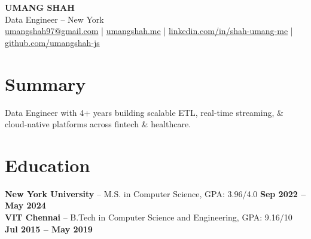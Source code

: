 \documentclass[letterpaper]{article}
\begin{document}
\begin{center}
{\Large \textbf{UMANG SHAH}}\\[-1pt]
Data Engineer -- New York\\[-1pt]
\href{mailto:umangshah97@gmail.com}{umangshah97@gmail.com} \;|\; \href{https://umangshah.me}{umangshah.me} \;|\; \href{https://www.linkedin.com/in/shah-umang-me}{linkedin.com/in/shah-umang-me} \;|\; \href{https://github.com/umangshah-js}{github.com/umangshah-js}
\end{center}

\vspace{-8pt}

\section*{Summary}
Data Engineer with 4+ years building scalable ETL, real-time streaming, \& cloud-native platforms across fintech \& healthcare.

\vspace{0pt}

\section*{Education}
\textbf{New York University} -- M.S. in Computer Science, GPA: 3.96/4.0 \hfill \textbf{Sep 2022 -- May 2024} \\
\textbf{VIT Chennai} -- B.Tech in Computer Science and Engineering, GPA: 9.16/10 \hfill \textbf{Jul 2015 -- May 2019}

\vspace{0pt}
\end{document}

